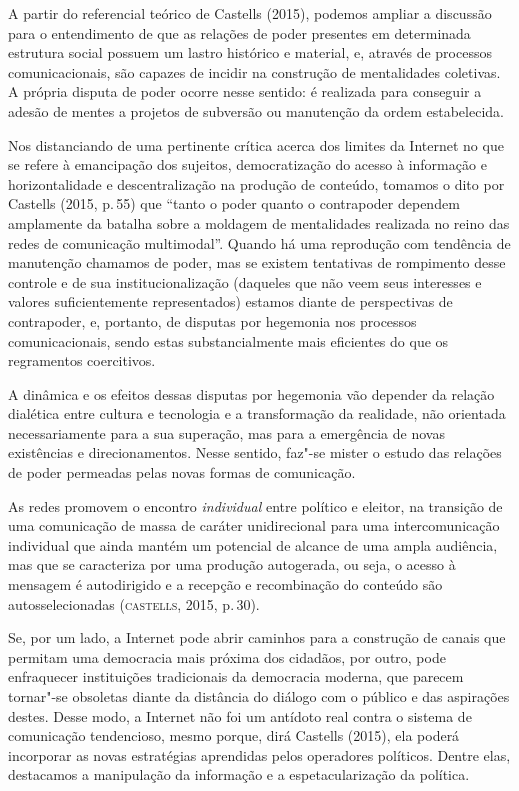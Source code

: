 A partir do referencial teórico de Castells (2015), podemos ampliar a
discussão para o entendimento de que as relações de poder presentes em
determinada estrutura social possuem um lastro histórico e material, e,
através de processos comunicacionais, são capazes de incidir na
construção de mentalidades coletivas. A própria disputa de poder ocorre
nesse sentido: é realizada para conseguir a adesão de mentes a projetos
de subversão ou manutenção da ordem estabelecida.

Nos distanciando de uma pertinente crítica acerca dos limites da
Internet no que se refere à emancipação dos sujeitos, democratização do
acesso à informação e horizontalidade e descentralização na produção de
conteúdo, tomamos o dito por Castells (2015, p.\,55) que ``tanto o poder
quanto o contrapoder dependem amplamente da batalha sobre a moldagem de
mentalidades realizada no reino das redes de comunicação multimodal''.
Quando há uma reprodução com tendência de manutenção chamamos de poder,
mas se existem tentativas de rompimento desse controle e de sua
institucionalização (daqueles que não veem seus interesses e valores
suficientemente representados) estamos diante de perspectivas de
contrapoder, e, portanto, de disputas por hegemonia nos processos
comunicacionais, sendo estas substancialmente mais eficientes do que os
regramentos coercitivos.

A dinâmica e os efeitos dessas disputas por hegemonia vão depender da
relação dialética entre cultura e tecnologia e a transformação da
realidade, não orientada necessariamente para a sua superação, mas para
a emergência de novas existências e direcionamentos. Nesse sentido,
faz"-se mister o estudo das relações de poder permeadas pelas novas
formas de comunicação.

As redes promovem o encontro \textit{individual} entre político e eleitor, na
transição de uma comunicação de massa de caráter unidirecional para uma
intercomunicação individual que ainda mantém um potencial de alcance de
uma ampla audiência, mas que se caracteriza por uma produção autogerada,
ou seja, o acesso à mensagem é autodirigido e a recepção e recombinação
do conteúdo são autosselecionadas (\textsc{castells}, 2015, p.\,30).

Se, por um lado, a Internet pode abrir caminhos para a construção de
canais que permitam uma democracia mais próxima dos cidadãos, por outro,
pode enfraquecer instituições tradicionais da democracia moderna, que
parecem tornar"-se obsoletas diante da distância do diálogo com o público
e das aspirações destes. Desse modo, a Internet não foi um antídoto real
contra o sistema de comunicação tendencioso, mesmo porque, dirá Castells
(2015), ela poderá incorporar as novas estratégias aprendidas pelos
operadores políticos. Dentre elas, destacamos a manipulação da
informação e a espetacularização da política.

